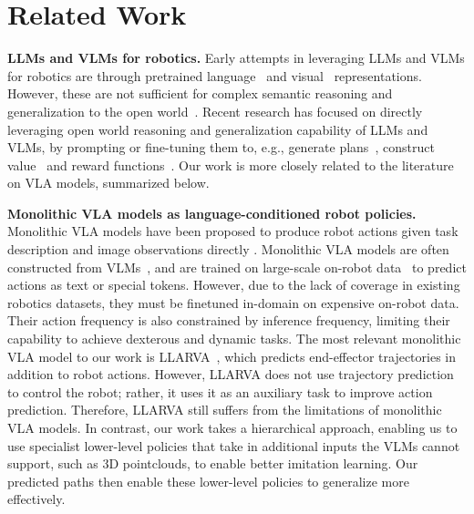 \section{Related Work}\label{sec:related_work}
\textbf{LLMs and VLMs for robotics.} 
Early attempts in leveraging LLMs and VLMs for robotics are through pretrained language~\citep{jang2022bc,shridhar2023perceiver,singh2023progprompt} and visual~\citep{shah2021rrl,parisi2022unsurprising,nair2023r3m,ma2023vip} representations. However, these are not sufficient for complex semantic reasoning and generalization to the open world~\citep{brohan2022rt,zitkovich2023rt}. Recent research has focused on directly leveraging open world reasoning and generalization capability of LLMs and VLMs, by 
prompting or fine-tuning them to, e.g., generate plans~\citep{huang2022language,huang2023inner,lin2023text2motion,liang2023code,singh2023progprompt,brohan2023can}, construct value~\citep{huang2023voxposer} and reward functions~\citep{kwon2023reward,RoboCLIP,yu2023language,ma2024eureka,wang2024rl}. Our work is more closely related to the literature on VLA models, summarized below.

\textbf{Monolithic VLA models as language-conditioned robot policies.}
Monolithic VLA models have been proposed to produce robot actions given task description and image observations directly \citep{brohan2022rt,jiang2023vima,zitkovich2023rt,team2024octo,kim2024openvla,radosavovic2023robot}. Monolithic VLA models are often constructed from VLMs~\citep{liu2024visual,bai2023qwen,driess2023palm,vila2024}, and are trained on large-scale on-robot data~\citep{brohan2022rt,open_x_embodiment_rt_x_2023,khazatsky2024droid} to predict actions as text or special tokens. However, due to the lack of coverage in existing robotics datasets, they must be finetuned in-domain on expensive on-robot data. Their action frequency is also constrained by inference frequency, limiting their capability to achieve dexterous and dynamic tasks. The most relevant monolithic VLA model to our work is LLARVA~\citep{niu2024llarva}, which predicts end-effector trajectories in addition to robot actions. However, LLARVA does not use trajectory prediction to control the robot; rather, it uses it as an auxiliary task to improve action prediction. Therefore, LLARVA still suffers from the limitations of monolithic VLA models. In contrast, our work takes a hierarchical approach, enabling us to use specialist lower-level policies that take in additional inputs the VLMs cannot support, such as 3D pointclouds, to enable better imitation learning. Our predicted paths then enable these lower-level policies to generalize more effectively.

